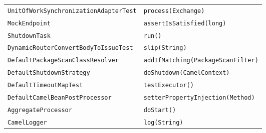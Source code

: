 \begin{center}
\begin{longtable}{ll}
\lstinline/UnitOfWorkSynchronizationAdapterTest/&{\lstinline/process(Exchange)/}\\
\lstinline/MockEndpoint/&{\lstinline/assertIsSatisfied(long)/}\\
\lstinline/ShutdownTask/&{\lstinline/run()/}\\
\lstinline/DynamicRouterConvertBodyToIssueTest/&{\lstinline/slip(String)/}\\
\lstinline/DefaultPackageScanClassResolver/&{\lstinline/addIfMatching(PackageScanFilter)/}\\
\lstinline/DefaultShutdownStrategy/&{\lstinline/doShutdown(CamelContext)/}\\
\lstinline/DefaultTimeoutMapTest/&{\lstinline/testExecutor()/}\\
\lstinline/DefaultCamelBeanPostProcessor/&{\lstinline/setterPropertyInjection(Method)/}\\
\lstinline/AggregateProcessor/&{\lstinline/doStart()/}\\
\lstinline/CamelLogger/&{\lstinline/log(String)/}\\
\end{longtable}
\end{center}


